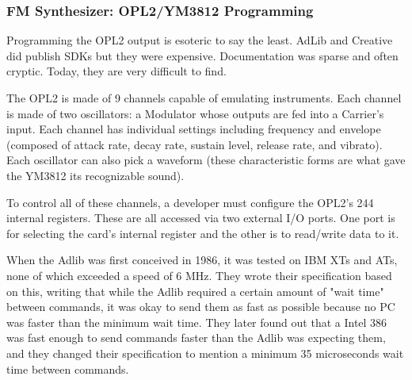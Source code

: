\documentclass[book.tex]{subfiles}
\begin{document}
\begin{minipage}{\textwidth}

\end{minipage}





\subsubsection{FM Synthesizer: OPL2/YM3812 Programming}
\label{IMF_explanation}
\par
Programming the OPL2 output is esoteric to say the least. AdLib and Creative did publish SDKs but they were expensive.  Documentation was sparse and often cryptic. Today, they are very difficult to find.\\
\par
The OPL2 is made of 9 channels capable of emulating instruments. Each channel is made of two oscillators: a Modulator whose outputs are fed into a Carrier's input. Each channel has individual settings including frequency and envelope (composed of attack rate, decay rate, sustain level, release rate, and vibrato). Each oscillator can also pick a waveform (these characteristic forms are what gave the YM3812 its recognizable sound).\\
\par
 To control all of these channels, a developer must configure the OPL2's 244 internal registers. These are all accessed via two external I/O ports. One port is for selecting the card's internal register and the other is to read/write data to it.\\
\par
\begin{minipage}{\textwidth}

\end{minipage}
\par
When the Adlib was first conceived in 1986, it was tested on IBM XTs and ATs, none of which exceeded a speed of 6 MHz. They wrote their specification based on this, writing that while the Adlib required a certain amount of "wait time" between commands, it was okay to send them as fast as possible because no PC was faster than the minimum wait time. They later found out that a Intel 386 was fast enough to send commands faster than the Adlib was expecting them, and they changed their specification to mention a minimum 35 microseconds wait time between commands.\\
\end{document}
